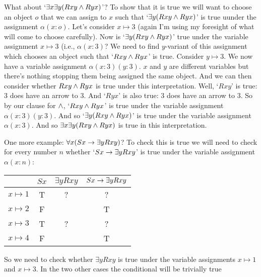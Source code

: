 What about `$\exists x \exists y(Rxy \mathbin{\wedge} Ryx)$'? To show that it is true we will want to choose an object $o$ that we can assign to $x$ such that `$\exists y (Rxy\mathbin{\wedge} Ryx)$' is true uunder the assignment $\alpha(x:o)$. Let's consider $x\mapsto 3$ (again I'm using my foresight of what will come to choose carefully). Now is `$\exists y (Rxy\mathbin{\wedge} Ryx)$'  true under the variable assignment $x\mapsto 3$ (i.e., $\alpha(x:3)$? We need to find $y$-variant of this assignment which chooses an object such that `$Rxy\mathbin{\wedge} Ryx$' is true. Consider $y\mapsto 3$. We now have a variable assignment $\alpha(x:3)(y:3)$. $x$ and $y$ are different variables but there's nothing stopping them being assigned the same object. And we can then consider whether $Rxy\mathbin{\wedge} Ryx$ is true under this interpretation. Well, `$Rxy$' is true: 3 does have an arrow to 3. And `$Ryx$' is also true: 3 does have an arrow to 3. So by our clause for $\mathbin{\wedge}$, `$Rxy\mathbin{\wedge} Ryx$' is true under the variable assignment $\alpha(x:3)(y:3)$. And so `$\exists y(Rxy\mathbin{\wedge} Ryx)$' is true under the variable assignment $\alpha(x:3)$. And so $\exists x\exists y(Rxy\mathbin{\wedge} Ryx)$ is true in this interpretation.

One more example: $\forall x(Sx\rightarrow \exists y Rxy)$? To check this is true we will need to check for every number $n$ whether `$Sx\rightarrow \exists y Rxy$' is true under the variable assignment $\alpha(x:n)$: \begin{center}
\begin{tabular}{c|ccc}
&$Sx$&$\exists y Rxy$&$Sx\rightarrow\exists y Rxy$\Bstrut\\\hline\Tstrut
$x\mapsto 1$&T&?&?\\
$x\mapsto 2$&F&&T\\
$x\mapsto 3$&T&?&?\\
$x\mapsto 4$&F&&T
\end{tabular}
\end{center}

So we need to check  whether $\exists y Rxy$ is true under the variable assignments $x\mapsto 1$ and $x\mapsto 3$. In the two other cases the conditional will be trivially true

